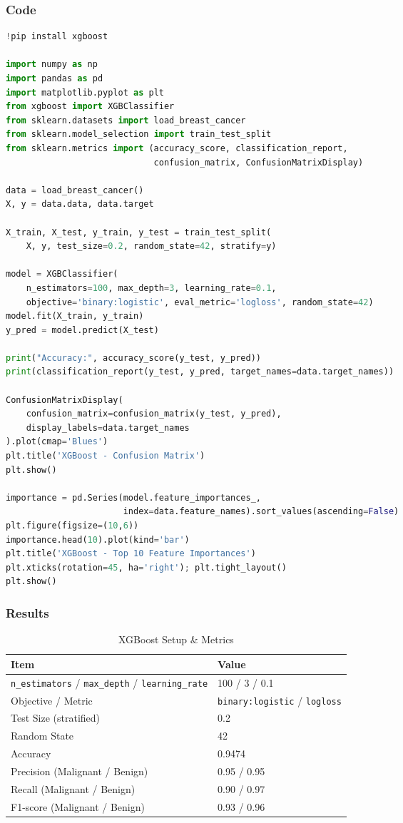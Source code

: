 \documentclass[a4paper,10pt]{article}
\begin{document}
\subsubsection{Code}
\begin{lstlisting}[language=Python, caption={XGBoost Classification Implementation}]
!pip install xgboost

import numpy as np
import pandas as pd
import matplotlib.pyplot as plt
from xgboost import XGBClassifier
from sklearn.datasets import load_breast_cancer
from sklearn.model_selection import train_test_split
from sklearn.metrics import (accuracy_score, classification_report,
                             confusion_matrix, ConfusionMatrixDisplay)

data = load_breast_cancer()
X, y = data.data, data.target

X_train, X_test, y_train, y_test = train_test_split(
    X, y, test_size=0.2, random_state=42, stratify=y)

model = XGBClassifier(
    n_estimators=100, max_depth=3, learning_rate=0.1,
    objective='binary:logistic', eval_metric='logloss', random_state=42)
model.fit(X_train, y_train)
y_pred = model.predict(X_test)

print("Accuracy:", accuracy_score(y_test, y_pred))
print(classification_report(y_test, y_pred, target_names=data.target_names))

ConfusionMatrixDisplay(
    confusion_matrix=confusion_matrix(y_test, y_pred),
    display_labels=data.target_names
).plot(cmap='Blues')
plt.title('XGBoost - Confusion Matrix')
plt.show()

importance = pd.Series(model.feature_importances_,
                       index=data.feature_names).sort_values(ascending=False)
plt.figure(figsize=(10,6))
importance.head(10).plot(kind='bar')
plt.title('XGBoost - Top 10 Feature Importances')
plt.xticks(rotation=45, ha='right'); plt.tight_layout()
plt.show()
\end{lstlisting}

\subsubsection{Results}
\begin{table}[H]
\centering
\caption{XGBoost Setup \& Metrics}
\begin{tabular}{ll}
\toprule
\textbf{Item} & \textbf{Value} \\
\midrule
\texttt{n\_estimators} / \texttt{max\_depth} / \texttt{learning\_rate} & 100 / 3 / 0.1 \\
Objective / Metric & \texttt{binary:logistic} / \texttt{logloss} \\
Test Size (stratified) & 0.2 \\
Random State & 42 \\
Accuracy & 0.9474 \\
Precision (Malignant / Benign) & 0.95 / 0.95 \\
Recall (Malignant / Benign) & 0.90 / 0.97 \\
F1-score (Malignant / Benign) & 0.93 / 0.96 \\
\bottomrule
\end{tabular}
\end{table}
\end{document}
